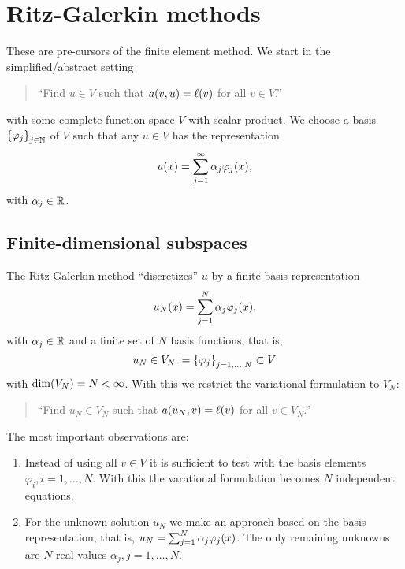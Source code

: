 \section{Ritz-Galerkin methods}

These are pre-cursors of the finite element method.
We start in the simplified/abstract setting
\begin{quote}
    ``Find \(u \in V\) such that \(a\parentheses*{v, u} = \ell\parentheses*{v}\) for all \(v \in V\).''
\end{quote}
with some complete function space \(V\) with scalar product.
We choose a basis \(\braces*{\varphi_j}_{j \in \N}\) of \(V\) such that any \(u \in V\) has the representation
\[
    u\parentheses*{x} = \sum_{j = 1}^\infty \alpha_j \varphi_j\parentheses*{x},
\]
with \(\alpha_j \in \R\).


\subsection{Finite-dimensional subspaces}

The Ritz-Galerkin method ``discretizes'' \(u\) by a finite basis representation
\[
    u_N\parentheses*{x} = \sum_{j = 1}^N \alpha_j \varphi_j\parentheses*{x},
\]
with \(\alpha_j \in \R\) and a finite set of \(N\) basis functions, that is,
\[
    u_N \in V_N := \braces*{\varphi_j}_{j = 1, \ldots, N} \subset V
\]
with \(\dim\parentheses*{V_N} = N < \infty\).
With this we restrict the variational formulation to \(V_N\):
\begin{quote}
    ``Find \(u_N \in V_N\) such that \(a\parentheses*{u_N, v} = \ell\parentheses*{v}\) for all \(v \in V_N\).''
\end{quote}
The most important observations are:

\begin{remark}
    \begin{enumerate}
        \item Instead of using all \(v \in V\) it is sufficient to test with the basis elements \(\varphi_i, i = 1, \ldots, N\).
        With this the varational formulation becomes \(N\) independent equations.
        \item For the unknown solution \(u_N\) we make an approach based on the basis representation, that is, \(u_N = \sum_{j = 1}^N \alpha_j \varphi_j\parentheses*{x}\).
        The only remaining unknowns are \(N\) real values \(\alpha_j, j = 1, \ldots, N\).
    \end{enumerate}
\end{remark}

